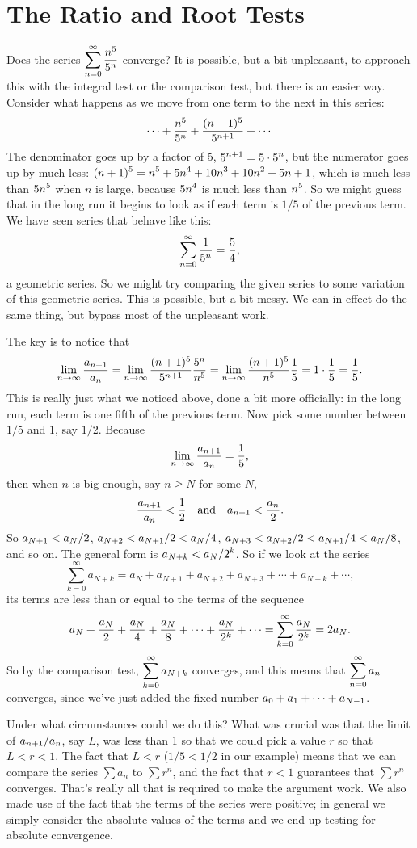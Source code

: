 \section{The Ratio and Root Tests}{}{}
\nobreak
Does the series $\displaystyle\sum_{n=0}^\infty {n^5\over 5^n}$ converge? It is
possible, but a bit unpleasant, to approach this with the integral
test or the comparison test, but there is an easier way. Consider what
happens as we move from one term to the next in this series:
$$\cdots+{n^5\over5^n}+{(n+1)^5\over 5^{n+1}}+\cdots$$
The denominator goes up by a factor of 5, $\displaystyle 5^{n+1}=5\cdot5^n$, but the
numerator goes up by much less: $\displaystyle (n+1)^5=n^5+5n^4+10n^3+10n^2+5n+1$,
which is much less than $\displaystyle 5n^5$ when $n$ is large, because $\displaystyle 5n^4$ is
much less than $\displaystyle n^5$. So we might guess that in the long run it begins
to look as if each term is $1/5$ of the previous term. We have seen
series that behave like this:
$$\sum_{n=0}^\infty {1\over 5^n} = {5\over4},$$
a geometric series. So we might try comparing the given series to some
variation of this geometric series. This is possible, but a bit
messy. We can in effect do the same thing, but bypass most of the
unpleasant work.

The key is to notice that
$$
  \lim_{n\to\infty} {a_{n+1}\over a_n}=
  \lim_{n\to\infty} {(n+1)^5\over 5^{n+1}}{5^n\over n^5}=
  \lim_{n\to\infty} {(n+1)^5\over n^5}{1\over 5}=1\cdot {1\over5}
    ={1\over 5}.
$$ 
This is really just what we noticed above, done a bit more officially:
in the long run, each term is one fifth of the previous term. Now pick
some number between $1/5$ and $1$, say $1/2$. Because
$$\lim_{n\to\infty} {a_{n+1}\over a_n}={1\over5},$$
then when $n$ is big enough, say $n\ge N$ for some $N$, 
$$
  {a_{n+1}\over a_n}<{1\over2} \quad \hbox{and}\quad a_{n+1}<{a_n\over2}.
$$
So $\displaystyle a_{N+1}< a_N/2$, $\displaystyle a_{N+2}<a_{N+1}/2<a_N/4$,
$\displaystyle a_{N+3}<a_{N+2}/2< a_{N+1}/4<a_N/8$, and so on. The general form is
$\displaystyle a_{N+k}< a_N/2^k$. So if we look at the series
$$
  \sum_{k=0}^\infty a_{N+k}=
  a_N+a_{N+1}+a_{N+2}+a_{N+3}+\cdots+a_{N+k}+\cdots,
$$
its terms are less than or equal to the terms of the sequence
$$
  a_N+{a_N\over2}+{a_N\over4}+{a_N\over8}+\cdots+{a_N\over2^k}+\cdots=
  \sum_{k=0}^\infty {a_N\over 2^k} = 2a_N.
$$
So by the comparison test, $\displaystyle\sum_{k=0}^\infty a_{N+k}$ converges,
and this means that $\displaystyle\sum_{n=0}^\infty a_{n}$ converges, since
we've just added the fixed number $\displaystyle a_0+a_1+\cdots+a_{N-1}$.

Under what circumstances could we do this? What was crucial was that
the limit of $\displaystyle a_{n+1}/a_n$, say $L$, was less than 1 so that we could pick a
value $r$ so that $L<r<1$. The fact that $L<r$ ($1/5<1/2$ in our
example) means that we can compare the series $\sum a_n$ to $\sum
r^n$, and the fact that $r<1$ guarantees that $\sum r^n$
converges. That's really all that is required to make the argument
work. We also made use of the fact that the terms of the series were
positive; in general we simply consider the absolute values of the
terms and we end up testing for absolute convergence.

